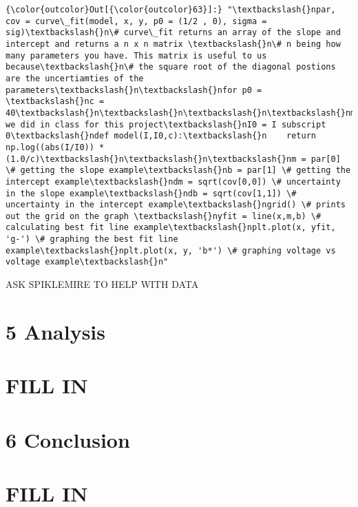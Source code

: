 \documentclass[11pt]{article}
\begin{document}
\begin{Verbatim}[commandchars=\\\{\}]
{\color{outcolor}Out[{\color{outcolor}63}]:} "\textbackslash{}npar, cov = curve\_fit(model, x, y, p0 = (1/2 , 0), sigma = sig)\textbackslash{}n\# curve\_fit returns an array of the slope and intercept and returns a n x n matrix \textbackslash{}n\# n being how many parameters you have. This matrix is useful to us because\textbackslash{}n\# the square root of the diagonal postions are the uncertiamties of the parameters\textbackslash{}n\textbackslash{}nfor p0 = \textbackslash{}nc = 40\textbackslash{}n\textbackslash{}n\textbackslash{}n\textbackslash{}nmodel we did in class for this project\textbackslash{}nI0 = I subscript 0\textbackslash{}ndef model(I,I0,c):\textbackslash{}n    return np.log((abs(I/I0)) * (1.0/c)\textbackslash{}n\textbackslash{}n\textbackslash{}nm = par[0] \# getting the slope example\textbackslash{}nb = par[1] \# getting the intercept example\textbackslash{}ndm = sqrt(cov[0,0]) \# uncertainty in the slope example\textbackslash{}ndb = sqrt(cov[1,1]) \# uncertainty in the intercept example\textbackslash{}ngrid() \# prints out the grid on the graph \textbackslash{}nyfit = line(x,m,b) \# calculating best fit line example\textbackslash{}nplt.plot(x, yfit, 'g-') \# graphing the best fit line example\textbackslash{}nplt.plot(x, y, 'b*') \# graphing voltage vs voltage example\textbackslash{}n"
\end{Verbatim}
            
    ASK SPIKLEMIRE TO HELP WITH DATA

\section{5 Analysis}\label{analysis}

\section{FILL IN}\label{fill-in}

\section{6 Conclusion}\label{conclusion}

\section{FILL IN}\label{fill-in-1}


    
    
    
    
\end{document}
